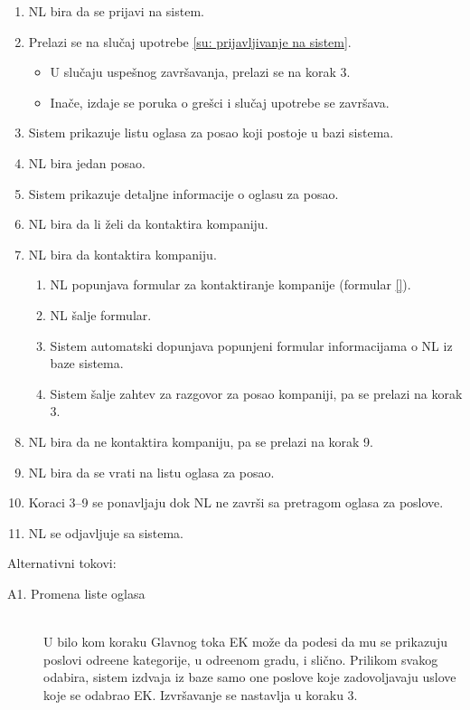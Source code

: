 \begin{enumerate}
	\item NL bira da se prijavi na sistem.
	\item Prelazi se na slu\v caj upotrebe \ref{su: prijavljivanje na sistem}.
	\begin{itemize}
		\item U slu\v caju uspe\v snog zavr\v savanja, prelazi se na korak 3.
		\item Ina\v ce, izdaje se poruka o gre\v sci i slu\v caj upotrebe se zavr\v sava.
	\end{itemize}
	\item Sistem prikazuje listu oglasa za posao koji postoje u bazi sistema.
	\item NL bira jedan posao.
	\item Sistem prikazuje detaljne informacije o oglasu za posao.
	\item NL bira da li \v zeli da kontaktira kompaniju.
	\item NL bira da kontaktira kompaniju.
	\begin{enumerate}
		\item NL popunjava formular za kontaktiranje kompanije (formular \ref{}).
		\item NL \v salje formular.
		\item Sistem automatski dopunjava popunjeni formular informacijama o NL iz baze sistema.
		\item Sistem \v salje zahtev za razgovor za posao kompaniji, pa se prelazi na korak 3.
	\end{enumerate}
	\item NL bira da ne kontaktira kompaniju, pa se prelazi na korak 9.
	\item NL bira da se vrati na listu oglasa za posao.
	\item Koraci 3--9 se ponavljaju dok NL ne zavr\v si sa pretragom oglasa za poslove.
	\item NL se odjavljuje sa sistema.
\end{enumerate}

\noindent Alternativni tokovi: 
\begin{description}
	\item[A1. Promena liste oglasa] ~\\
		U bilo kom koraku Glavnog toka EK mo\v ze da podesi da mu se prikazuju poslovi odre\dj ene kategorije, u odre\dj enom gradu, i sli\v cno. Prilikom svakog odabira, sistem izdvaja iz baze samo one poslove koje zadovoljavaju uslove koje se odabrao EK. Izvr\v savanje se nastavlja u koraku 3.
\end{description}


